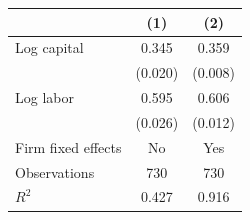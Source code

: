 \begin{tabular}{lcc}
\toprule
 & (1) & (2) \\
\midrule
Log capital & 0.345 & 0.359 \\
 & (0.020) & (0.008) \\
Log labor & 0.595 & 0.606 \\
 & (0.026) & (0.012) \\
\midrule
Firm fixed effects & No & Yes \\
Observations & 730 & 730 \\
$R^2$ & 0.427 & 0.916 \\
\bottomrule
\end{tabular}
